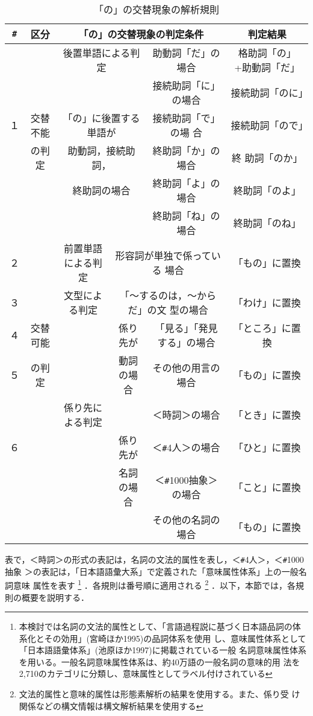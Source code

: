 \begin{table}[htbp]
\caption{「の」の交替現象の解析規則}
\begin{center}
\begin{tabular}{|c|c|c|c|c|c|} \hline
{\verb+#+} & 区分 & \multicolumn{3}{|c|}{「の」の交替現象の判定条件} & 判定結果\\ \hline
 & & \multicolumn{2}{|c|}{後置単語による判定} & 助動詞「だ」の場合 & 格助詞「の」
 +助動詞「だ」\\ \cline{5-6}
 & & \multicolumn{2}{|c|}{} & 接続助詞「に」の場合 & 接続助詞「のに」\\ \cline{5-6}
１ & 交替不能 & \multicolumn{2}{|c|}{「の」に後置する単語が} & 接続助詞「で」の場
 合 & 接続助詞「ので」\\ \cline{5-6}
 & の判定 & \multicolumn{2}{|c|}{助動詞，接続助詞，} & 終助詞「か」の場合 & 終
 助詞「のか」\\ \cline{5-6}
 & & \multicolumn{2}{|c|}{終助詞の場合} & 終助詞「よ」の場合 & 終助詞「のよ」
 \\ \cline{5-6}
 & & \multicolumn{2}{|c|}{} & 終助詞「ね」の場合 & 終助詞「のね」\\ \hline
２ & & 前置単語による判定 & \multicolumn{2}{|c|}{形容詞が単独で係っている
 場合} & 「もの」に置換\\ \cline{1-1} \cline{3-6}
３ & & 文型による判定 & \multicolumn{2}{|c|}{「〜するのは，〜からだ」の文
 型の場合} & 「わけ」に置換\\ \cline{1-1} \cline{3-6}
４ & 交替可能 & & 係り先が & 「見る」「発見する」の場合 & 「ところ」に置換
 \\ \cline{1-1} \cline{5-6}
５ & の判定 & & 動詞の場合 & その他の用言の場合 & 「もの」に置換\\ \cline{1-1} \cline{4-6}
 & & 係り先による判定 & & ＜時詞＞の場合 & 「とき」に置換\\ \cline{5-6}
６ & & & 係り先が & ＜{\verb+#+}4人＞の場合 & 「ひと」に置換\\ \cline{5-6}
 & & & 名詞の場合 & ＜{\verb+#+}1000抽象＞の場合 & 「こと」に置換\\ \cline{5-6}
 & & & & その他の名詞の場合 & 「もの」に置換\\ \hline
\end{tabular}
\end{center}
\end{table}

表で，＜時詞＞の形式の表記は，名詞の文法的属性を表し，＜{\verb+#+}4人＞，＜{\verb+#+}1000抽象
＞の表記は，「日本語語彙大系」で定義された「意味属性体系」上の一般名詞意味
属性を表す
\footnote{本検討では名詞の文法的属性として、「言語過程説に基づく日本語品詞の体系化とその効用」(宮崎ほか1995)の品詞体系を使用
し、意味属性体系として「日本語語彙体系」(池原ほか1997)に掲載されている一般
名詞意味属性体系を用いる。一般名詞意味属性体系は、約40万語の一般名詞の意味的用
法を2,710のカテゴリに分類し、意味属性としてラベル付けされている}
．各規則は番号順に適用される
\footnote{文法的属性と意味的属性は形態素解析の結果を使用する。また、係り受
け関係などの構文情報は構文解析結果を使用する}
．以下，本節では，各規則の概要を説明する．

